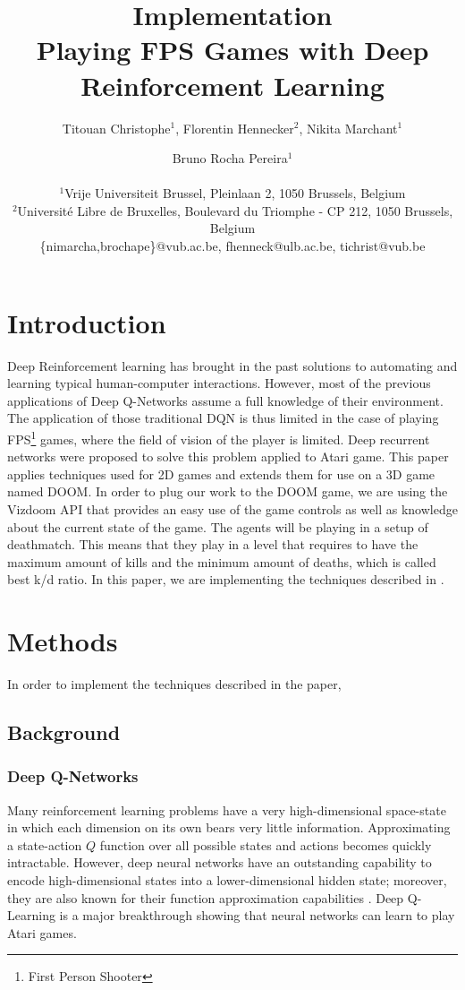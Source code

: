 \documentclass[letterpaper]{article}
\title{Implementation\\Playing FPS Games with Deep Reinforcement Learning}
\author{Titouan Christophe$^{1}$, Florentin Hennecker$^{2}$, Nikita Marchant$^{1}$ \and Bruno Rocha Pereira$^{1}$ \\
\mbox{}\\
$^1$Vrije Universiteit Brussel, Pleinlaan 2, 1050 Brussels, Belgium \\
$^2$Universit\'e Libre de Bruxelles, Boulevard du Triomphe - CP 212, 1050
Brussels, Belgium \\
\{nimarcha,brochape\}@vub.ac.be, fhenneck@ulb.ac.be, tichrist@vub.be}
\begin{document}
\maketitle

\begin{abstract}
\end{abstract}

\section{Introduction}
Deep Reinforcement learning has brought in the past solutions to automating and
learning typical human-computer interactions. 
However, most of the previous applications of Deep Q-Networks assume a full
knowledge of their environment. The application of those traditional DQN is
thus limited in the case of playing FPS\footnote{First Person Shooter} games,
where the field of vision of the player is limited. Deep recurrent networks
were proposed to solve this problem \citep{Hausknecht2015} applied to Atari
game. This paper applies techniques used for 2D games and extends them for use
on a 3D game named DOOM.
In order to plug our work to the DOOM game, we are using the Vizdoom API
\citep{Kempka2016} that provides an easy use of the game controls as well as
knowledge about the current state of the game.
The agents will be playing in a setup of deathmatch. This means that they play
in a level that requires to have the maximum amount of kills and the minimum
amount of deaths, which is called best k/d ratio.
In this paper, we are implementing the techniques described in
\citep{Lample2016}.

\section{Methods}
In order to implement the techniques described in the paper,

\subsection{Background}
\subsubsection{Deep Q-Networks}
Many reinforcement learning problems have a very high-dimensional space-state
in which each dimension on its own bears very little information. Approximating
a state-action $Q$ function over all possible states and actions becomes quickly
intractable. However, deep neural networks have an outstanding capability to
encode high-dimensional states into a lower-dimensional hidden state; moreover,
they are also known for their function approximation capabilities
\citep{Hornik1991}. Deep Q-Learning \citep{Mnih2015} is a major breakthrough
showing that neural networks can learn to play Atari games.
\end{document}
